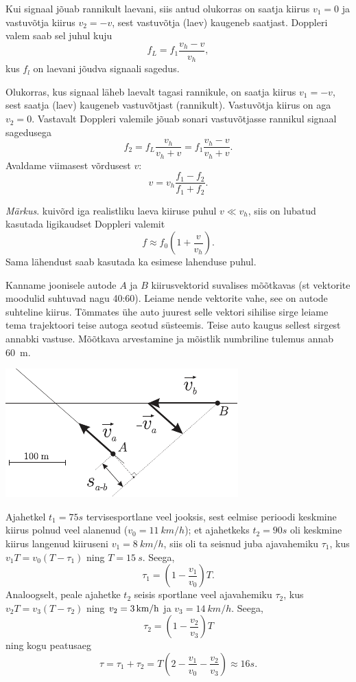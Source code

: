 \documentclass[10pt, twoside]{article}
\begin{document}
{Kui signaal jõuab rannikult laevani, siis antud olukorras on saatja kiirus $v_1 = 0$ ja vastuvõtja kiirus $v_2 = -v$, sest vastuvõtja (laev) kaugeneb saatjast. Doppleri valem saab sel juhul kuju
\[
f_L = f_1 \frac{v_h-v}{v_h}, 
\]
kus $f_l$ on laevani jõudva signaali sagedus.

Olukorras, kus signaal läheb laevalt tagasi rannikule, on saatja kiirus $v_1 = -v$, sest saatja (laev) kaugeneb vastuvõtjast (rannikult). Vastuvõtja kiirus on aga $v_2 = 0$. Vastavalt Doppleri valemile jõuab sonari vastuvõtjasse rannikul signaal sagedusega
\[
f_2 = f_L \frac{v_h}{v_h+v} = f_1 \frac{v_h-v}{v_h+v}. 
\]
Avaldame viimasest võrdusest $v$:
\[
v = v_h \frac{f_1-f_2}{f_1+f_2}. 
\]

\emph{Märkus}. kuivõrd iga realistliku laeva kiiruse puhul $v \ll v_h$, siis on lubatud
kasutada ligikaudset Doppleri valemit
\[
f \approx f_0 \left(1+\frac{v}{v_h}\right).
\]
Sama lähendust saab kasutada ka esimese lahenduse puhul.
\probend
\bigskip


\solu
Kanname joonisele autode $A$ ja $B$ kiirusvektorid suvalises mõõtkavas (st vektorite moodulid suhtuvad nagu 40:60). Leiame nende vektorite vahe, see on autode suhteline kiirus. Tõmmates ühe auto juurest selle vektori sihilise sirge leiame tema trajektoori teise autoga seotud süsteemis. Teise auto kaugus sellest sirgest annabki vastuse. Mõõtkava arvestamine ja mõistlik numbriline tulemus annab \SI{60}{m}.
\begin{center}
	\includegraphics[width=0.7\linewidth]{2008-v2g-02-lah}
\end{center}
\probend
\bigskip


\solu
Ajahetkel $t_1=\SI{75}s$ tervisesportlane veel jooksis, sest eelmise perioodi keskmine kiirus polnud veel alanenud ($v_0=\SI{11}{km/h}$);
et ajahetkeks $t_2=\SI {90}s$ oli keskmine kiirus langenud kiiruseni $v_1=\SI{8}{km/h}$, siis oli ta seisnud juba ajavahemiku
$\tau_1$, kus $v_1 T= v_0 (T-\tau_1)$ ning $T=\SI{15}{s}$. Seega, 
\[
\tau_1=\left(1-\frac{v_1}{v_0}\right)T.
\]
Analoogselt, peale ajahetke $t_2$ seisis
sportlane veel ajavahemiku $\tau_2$, kus $v_2 T= v_3 (T-\tau_2)$ ning $v_2=\SI 3{km/h}$ ja $v_3=\SI{14}{km/h}$. Seega, 
\[
\tau_2=\left(1-\frac{v_2}{v_3}\right)T
\]
ning kogu peatusaeg
\[
\tau=\tau_1+\tau_2=T\left(2-\frac{v_1}{v_0}- \frac{v_2}{v_3}\right)\approx \SI{16}s.
\]
\probend
\bigskip

}
\end{document}
